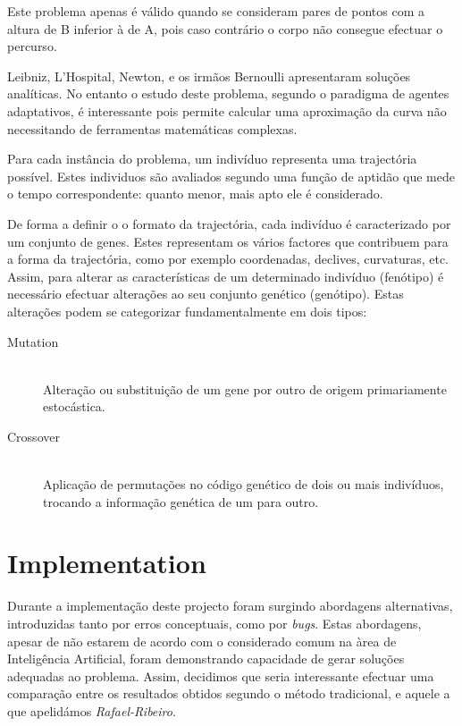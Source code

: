 \documentclass[a4paper]{article}
\begin{document}
\indent Este problema apenas é válido quando se consideram pares de pontos com a altura de B inferior à de A, pois caso contrário o corpo não consegue efectuar o percurso.

Leibniz, L'Hospital, Newton, e os irmãos Bernoulli apresentaram soluções analíticas.
No entanto o estudo deste problema, segundo o paradigma de agentes adaptativos, é interessante pois permite calcular uma aproximação da curva
não necessitando de ferramentas matemáticas complexas.

\indent Para cada instância do problema, um indivíduo representa uma trajectória possível. Estes individuos são avaliados segundo uma
função de aptidão que mede o tempo correspondente: quanto menor, mais apto ele é considerado.

\indent De forma a definir o o formato da trajectória, cada indivíduo é caracterizado por um conjunto de genes. Estes representam os vários
factores que contribuem para a forma da trajectória, como por exemplo coordenadas, declives, curvaturas, etc. Assim, para alterar as características
de um determinado indivíduo (fenótipo) é necessário efectuar alterações ao seu conjunto genético (genótipo). Estas alterações podem se categorizar
fundamentalmente em dois tipos:

\begin{description}
	\item[Mutation] \hfill \\ 
		Alteração ou substituição de um gene por outro de origem primariamente estocástica.
	\item[Crossover] \hfill \\ 
		Aplicação de permutações no código genético de dois ou mais indivíduos, trocando a informação genética de um para outro.
\end{description}

\cleardoublepage
\section{Implementation}
\indent \indent Durante a implementação deste projecto foram surgindo abordagens alternativas,
introduzidas tanto por erros conceptuais, como por \emph{bugs}. Estas abordagens, apesar de não estarem de acordo com
o considerado comum na àrea de Inteligência Artificial, foram demonstrando capacidade de gerar soluções adequadas ao problema.
Assim, decidimos que seria interessante efectuar uma comparação entre os resultados obtidos segundo o método tradicional, e aquele a que apelidámos \emph{Rafael-Ribeiro}. 
\end{document}
